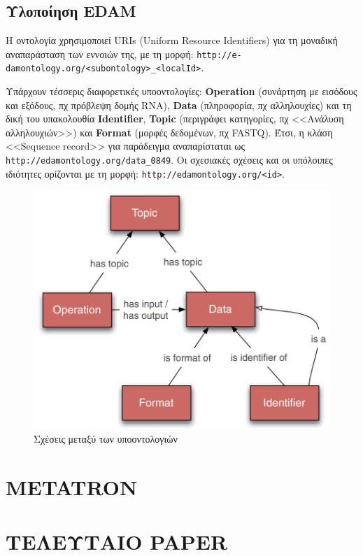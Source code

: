    \subsection{Υλοποίηση EDAM}
        Η οντολογία χρησιμοποιεί URIs (Uniform Resource Identifiers) για τη μοναδική αναπαράσταση των εννοιών της, με τη μορφή: \verb|http://e-damontology.org/<subontology>_<localId>|.

        Υπάρχουν τέσσερις διαφορετικές υποοντολογίες: \textbf{Operation} (συνάρτηση με εισόδους και εξόδους, πχ πρόβλεψη δομής RNA), \textbf{Data} (πληροφορία, πχ αλληλουχίες) και τη δική του υπακολουθία \textbf{Identifier}, \textbf{Topic} (περιγράφει κατηγορίες, πχ <<Ανάλυση αλληλουχιών>>) και \textbf{Format} (μορφές δεδομένων, πχ FASTQ).
        Έτσι, η κλάση <<Sequence record>> για παράδειγμα αναπαρίσταται ως \verb|http://edamontology.org/data_0849|. \linebreak
        Οι σχεσιακές σχέσεις και οι υπόλοιπες ιδιότητες ορίζονται με τη μορφή: \verb|http://edamontology.org/<id>|.

        \begin{figure}[h!] \noindent\centering
            \includegraphics[scale=0.4]{img/Edam subontologies}
            \caption{Σχέσεις μεταξύ των υποοντολογιών \cite{EDAMpaper}}
        \end{figure}



\section{METATRON}

\section{ΤΕΛΕΥΤΑΙΟ PAPER}